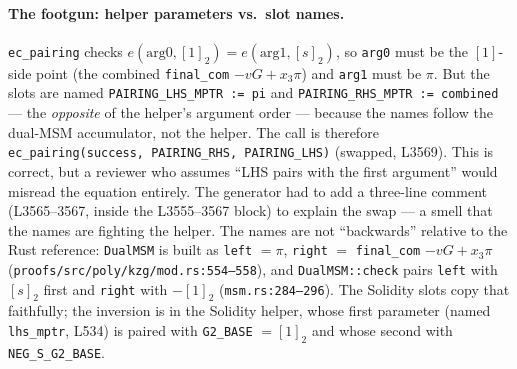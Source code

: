 \paragraph{The footgun: helper parameters vs.\ slot names.}
\texttt{ec\_pairing} checks $e(\text{arg0},[1]_2)=
e(\text{arg1},[s]_2)$, so \texttt{arg0} must be the
$[1]$-side point (the combined \texttt{final\_com}
$- vG + x_3\pi$) and \texttt{arg1} must be $\pi$. But the slots
are named \texttt{PAIRING\_\allowbreak{}LHS\_\allowbreak{}MPTR := pi} and
\texttt{PAIRING\_\allowbreak{}RHS\_\allowbreak{}MPTR := combined} --- the \emph{opposite}
of the helper's argument order --- because the names follow the
dual-MSM accumulator, not the helper. The call is therefore
\texttt{ec\_\allowbreak{}pairing(success, PAIRING\_\allowbreak{}RHS, PAIRING\_\allowbreak{}LHS)}
(swapped, L3569). This is correct, but a reviewer who assumes
``LHS pairs with the first argument'' would misread the equation
entirely. The generator had to add a three-line comment
(L3565--3567, inside the L3555--3567 block) to explain the swap
--- a smell that the names are fighting the helper.
 The names are not ``backwards'' relative to the
Rust reference: \texttt{DualMSM} is built as \texttt{left} $=\pi$,
\texttt{right} $=$ \texttt{final\_com} $-vG+x_3\pi$
(\texttt{proofs/\allowbreak{}src/\allowbreak{}poly/\allowbreak{}kzg/\allowbreak{}mod.rs:554--558}), and
\texttt{DualMSM::check} pairs \texttt{left} with $[s]_2$ first and
\texttt{right} with $-[1]_2$ (\texttt{msm.rs:284--296}). The
Solidity slots copy that faithfully; the inversion is in the
Solidity helper, whose first parameter (named \texttt{lhs\_mptr},
L534) is paired with \texttt{G2\_BASE} $=[1]_2$ and whose second
with \texttt{NEG\_S\_G2\_BASE}.

